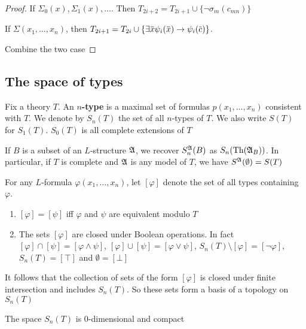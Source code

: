 \documentclass[11pt]{article}
\begin{document}
\begin{proof}

If \(\Sigma_0(x),\Sigma_1(x),\dots\). Then
\(T_{2i+2}=T_{2i+1}\cup\{\neg\sigma_m(c_{mn})\}\)

If \(\Sigma(x_1,\dots,x_n)\), then
\(T_{2i+1}=T_{2i}\cup\{\exists\bbar{x}\psi_i(\bbar{x})\to\psi_i(\bbar{c})\}\).

Combine the two case
\end{proof}
\subsection{The space of types}
\label{sec:org05645eb}
Fix a theory \(T\). An \textbf{\(n\)-type} is a maximal set of formulas
\(p(x_1,\dots,x_n)\) consistent with \(T\). We denote by \(S_n(T)\) the set
of all \(n\)-types of \(T\). We also write \(S(T)\) for \(S_1(T)\).
\(S_0(T)\) is all complete extensions of \(T\)

If \(B\) is a subset of an \(L\)-structure \(\mathfrak{A}\), we recover
\(S_n^{\mathfrak{A}}(B)\) as \(S_n(\operatorname{Th}(\mathfrak{A}_B))\). In particular, if \(T\) is complete
and \(\mathfrak{A}\) is any model of \(T\), we have \(S^{\mathfrak{A}}(\emptyset)=S(T)\)

For any \(L\)-formula \(\varphi(x_1,\dots,x_n)\), let \([\varphi]\) denote the set of all
types containing \(\varphi\).

\begin{lemma}[]
\begin{enumerate}
\item \([\varphi]=[\psi]\) iff \(\varphi\) and \(\psi\) are equivalent modulo \(T\)
\item The sets \([\varphi]\) are closed under Boolean operations. In fact
\([\varphi]\cap[\psi]=[\varphi\wedge\psi]\), \([\varphi]\cup[\psi]=[\varphi\vee\psi]\),
\(S_n(T)\setminus[\varphi]=[\neg\varphi]\), \(S_n(T)=[\top]\) and \(\emptyset=[\bot]\)
\end{enumerate}
\end{lemma}

It follows that the collection of sets of the form \([\varphi]\) is closed under
finite intersection and includes \(S_n(T)\). So these sets form a basis of a
topology on \(S_n(T)\)

\begin{lemma}[]
The space \(S_n(T)\) is 0-dimensional and compact
\end{lemma}
\end{document}
